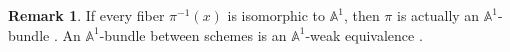 \documentclass[11pt, reqno]{amsart}
\theoremstyle{plain}
\theoremstyle{definition}
\newtheorem{remark}[thm]{Remark}
\newtheorem{definition}[thm]{Definition}
\newcommand{\red}{{\rm red}}
\newcommand{\sC}{{\mathcal C}}
\newcommand{\sO}{{\mathcal O}}
\newcommand{\A}{{\mathbb A}}
\begin{document}
          \begin{remark} \label{comments of structure theorem}
          	If every fiber $\pi^{-1}(x)$ is isomorphic to $\mathbb{A}^1$, then $\pi$ is actually an $\mathbb{A}^1$-bundle \cite[Proposition 3]{doub}. An $\mathbb{A}^1$-bundle between schemes is an $\mathbb{A}^1$-weak equivalence \cite[Theorem 5.3.1.3]{as}.
         
    \end{remark}



		
\end{document}
